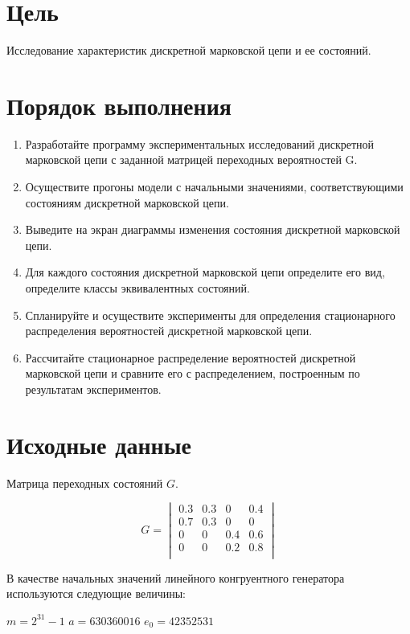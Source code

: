 \section{Цель}

Исследование характеристик дискретной марковской цепи и ее состояний.

\section{Порядок выполнения}

\begin{enumerate}
    \item Разработайте программу экспериментальных исследований дискретной марковской цепи с заданной матрицей переходных вероятностей G.
    \item Осуществите прогоны модели с начальными значениями, соответствующими состояниям дискретной марковской цепи.
    \item Выведите на экран диаграммы изменения состояния дискретной марковской цепи.
    \item Для каждого состояния дискретной марковской цепи определите его вид, определите классы эквивалентных состояний.
    \item Спланируйте и осуществите эксперименты для определения стационарного распределения вероятностей дискретной марковской цепи.
    \item Рассчитайте стационарное распределение вероятностей дискретной марковской цепи и сравните его с распределением, построенным по результатам экспериментов.
\end{enumerate}

\section{Исходные данные}

Матрица переходных состояний $G$.

\[
    G=
    \begin{vmatrix}
        0.3&0.3&0&0.4\\
        0.7&0.3&0&0\\
        0&0&0.4&0.6\\
        0&0&0.2&0.8\\
    \end{vmatrix}
\]

В качестве начальных значений линейного конгруентного генератора используются следующие величины:

$m=2^31 - 1$
$a=630360016$
$e_0=42352531$

